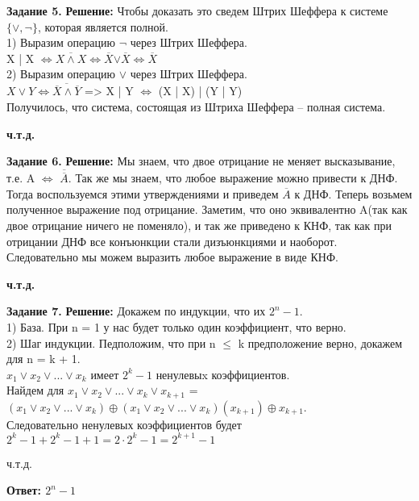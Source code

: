 \documentclass[12pt,a4paper]{scrartcl}
\begin{document}
	\noindent
	\textbf{Задание 5.}
	\newline
	\textbf{Решение:}
	\newline
	\indent
	Чтобы доказать это сведем Штрих Шеффера к системе $\{ \vee , \neg \}$, которая является полной. \\
	1) Выразим операцию $\neg$ через Штрих Шеффера. \\
	X | X  $ \Leftrightarrow \overline{X \wedge X} \Leftrightarrow \overline{X}$$\vee \overline{X} \Leftrightarrow \overline{X}$ \\
	2) Выразим операцию $\vee$ через Штрих Шеффера. \\
	$X \vee Y \Leftrightarrow \overline{\overline{X} \wedge \overline{Y}}$ =>
	X | Y $\Leftrightarrow$ (X | X) | (Y | Y) \\
	Получилось, что система, состоящая из Штриха Шеффера -- полная система.
	\begin{flushright}
		\textbf{ч.т.д.}
	\end{flushright}
	\textbf{Задание 6.} 
	\newline
	\textbf{Решение:}
	\newline
	\indent
	Мы знаем, что двое отрицание не меняет высказывание, т.е. A $\Leftrightarrow$ $\overline{\overline{A}}$. Так же мы знаем, что любое выражение можно привести к ДНФ. Тогда воспользуемся этими утверждениями и приведем $\overline{A}$ к ДНФ. Теперь возьмем полученное выражение под отрицание. Заметим, что оно эквивалентно A(так как двое отрицание ничего не поменяло), и так же приведено к КНФ, так как при отрицании ДНФ все конъюнкции стали дизъюнкциями и наоборот. \\
	Следовательно мы можем выразить любое выражение в виде КНФ.
	\begin{flushright}
		\textbf{ч.т.д.}
	\end{flushright}
	\textbf{Задание 7.} 
	\newline
	\textbf{Решение:}
	\newline
	\indent
	Докажем по индукции, что их $2^n - 1$. \\
	1) База. При  n = 1 у нас будет только один коэффициент, что верно.\\
	2) Шаг индукции. Педположим, что при n $\leq$ k предположение верно, докажем для n = k + 1. \\
	$x_1 \lor x_2 \lor ... \lor x_k$ имеет $2^k - 1$ ненулевыx коэффициентов.\\
	Найдем для $x_1 \lor x_2 \lor ... \lor x_k \lor x_{k + 1}$ = $(x_1 \lor x_2 \lor ... \lor x_k) \oplus (x_1 \lor x_2 \lor ... \lor x_k)(x_{k + 1}) \oplus x_{k + 1}$.\\
	Следовательно ненулевых коэффициентов будет $2^k - 1 + 2^k - 1 + 1 = 2 \cdot 2^k - 1 = 2^{k + 1} - 1$
	\begin{flushright}
		ч.т.д.
	\end{flushright}
	\begin{flushright}
		\textbf{Ответ: $2^n - 1$}
	\end{flushright}
\end{document}
